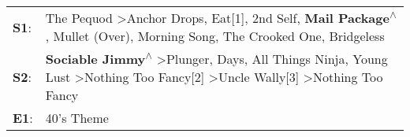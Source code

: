 \begin{supertabular}{p{0.03\textwidth}p{0.92\textwidth}}
 \textbf{S1}:  &                The Pequod\textsuperscript{} \textgreater \enspace Anchor Drops\textsuperscript{}, \enspace Eat[1]\textsuperscript{}, \enspace 2nd Self\textsuperscript{}, \enspace \textbf{Mail Package\textsuperscript{$\wedge$}}, \enspace Mullet (Over)\textsuperscript{}, \enspace Morning Song\textsuperscript{}, \enspace The Crooked One\textsuperscript{}, \enspace Bridgeless\textsuperscript{}  \enspace  \\
 \textbf{S2}:  &  \textbf{Sociable Jimmy\textsuperscript{$\wedge$}} \textgreater \enspace Plunger\textsuperscript{},  Days\textsuperscript{}, \enspace All Things Ninja\textsuperscript{}, \enspace Young Lust\textsuperscript{} \textgreater \enspace Nothing Too Fancy[2]\textsuperscript{} \textgreater \enspace Uncle Wally[3]\textsuperscript{} \textgreater \enspace Nothing Too Fancy\textsuperscript{}  \enspace  \\
 \textbf{E1}:  &                                                                                                                                                                                                                                                                                                                                                                             40's Theme\textsuperscript{}  \enspace  \\
\end{supertabular}
